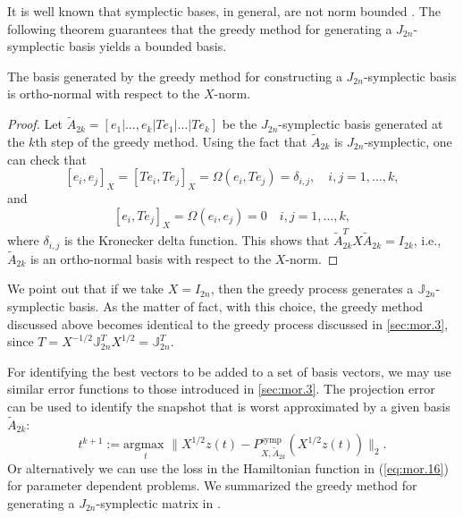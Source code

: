 It is well known that symplectic bases, in general, are not norm bounded \cite{doi:10.1137/050628519}. The following theorem guarantees that the greedy method for generating a $J_{2n}$-symplectic basis yields a bounded basis.
\begin{theorem}
The basis generated by the greedy method for constructing a $J_{2n}$-symplectic basis is ortho-normal with respect to the $X$-norm.
\end{theorem}
\begin{proof}
Let $\tilde A_{2k}=[e_1|\dots,e_k|Te_1|\dots|Te_k]$ be the $J_{2n}$-symplectic basis generated at the $k$th step of the greedy method. Using the fact that $\tilde A_{2k}$ is $J_{2n}$-symplectic, one can check that
\begin{equation} \label{eq:normmor.12}
	[e_i,e_j]_X = [Te_i,Te_j]_X = \Omega(e_i,Te_j)=\delta_{i,j}, \quad i,j=1,\dots,k,	
\end{equation}
and
\begin{equation} \label{eq:normmor.13}
	[e_i,Te_j]_X = \Omega(e_i,e_j) = 0\quad i,j=1,\dots,k,
\end{equation}
where $\delta_{i,j}$ is the Kronecker delta function. This shows that $\tilde A_{2k}^TX\tilde A_{2k} = I_{2k}$, i.e., $\tilde A_{2k}$ is an ortho-normal basis with respect to the $X$-norm.
\end{proof}
We point out that if we take $X=I_{2n}$, then the greedy process generates a $\mathbb J_{2n}$- symplectic basis. As the matter of fact, with this choice, the greedy method discussed above becomes identical to the greedy process discussed in \cref{sec:mor.3}, since $T = X^{-1/2}\mathbb J_{2n}^TX^{1/2} = \mathbb J_{2n}^T$.

For identifying the best vectors to be added to a set of basis vectors, we may use similar error functions to those introduced in \cref{sec:mor.3}. The projection error can be used to identify the snapshot that is worst approximated by a given basis $\tilde A_{2k}$:
\begin{equation} \label{eq:normmor.14}
	t^{k+1} := \underset{t}{\text{argmax } }\| X^{1/2}z(t) - P^\text{symp}_{X,\tilde A_{2k}}(X^{1/2}z(t)) \|_2. 
\end{equation}
Or alternatively we can use the loss in the Hamiltonian function in (\ref{eq:mor.16}) for parameter dependent problems. We summarized the greedy method for generating a $J_{2n}$-symplectic matrix in .

